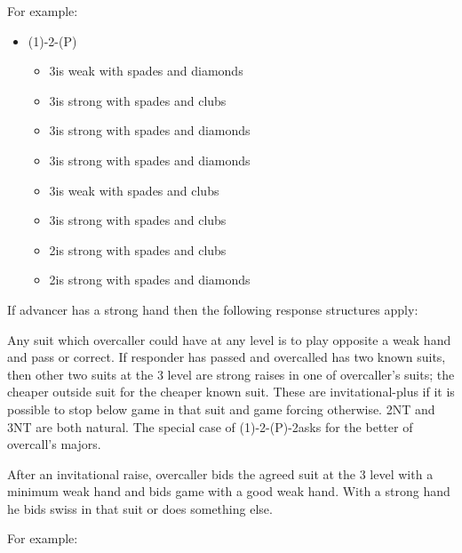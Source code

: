 \documentclass[a4paper,14pt]{extarticle}
\begin{document}
For example:
\begin{itemize}
\item (1\hearts)-2\hearts-(P)
	\begin{itemize}
	\item 3\diamonds is weak with spades and diamonds
	\item 3\hearts is strong with spades and clubs
	\item 3\spades is strong with spades and diamonds
	\item 3\hearts is strong with spades and diamonds
	\item 3\spades is weak with spades and clubs
	\item 3\clubs is strong with spades and clubs
	\item 2\clubs is strong with spades and clubs
	\item 2\diamonds is strong with spades and diamonds
	\end{itemize}
\end{itemize}

If advancer has a strong hand then the following response structures apply:

Any suit which overcaller could have at any level is to play opposite a weak
hand and pass or correct. If responder has passed and overcalled has two known
suits, then other two suits at the 3 level are strong raises in one of
overcaller's suits; the cheaper outside suit for the cheaper known suit. These
are invitational-plus if it is possible to stop below game in that suit and
game forcing otherwise. 2NT and 3NT are both natural. The special case of
(1\clubs)-2\clubs-(P)-2\diamonds asks for the better of
overcall's majors.

After an invitational raise, overcaller bids the agreed suit at the 3 level
with a minimum weak hand and bids game with a good weak hand. With a strong
hand he bids swiss in that suit or does something else.

For example:
\end{document}
